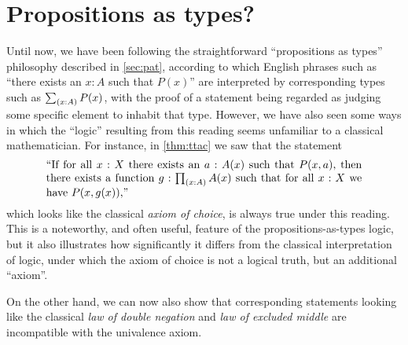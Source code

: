 \section{Propositions as types?}
\label{subsec:pat?}

Until now, we have been following the straightforward ``propositions as types'' philosophy described in \autoref{sec:pat}, according to which English phrases such as ``there exists an $x:A$ such that $P(x)$'' are interpreted by corresponding types such as $\sm{x:A} P(x)$, with the proof of a statement being regarded as judging some specific element to inhabit that type.
However, we have also seen some ways in which the ``logic'' resulting from this reading seems unfamiliar to a classical mathematician.
For instance, in \autoref{thm:ttac} we saw that the statement
\begin{equation}\label{eq:english-ac}
  \parbox{\textwidth-2cm}{``If for all $x:X$ there exists an $a:A(x)$ such that $P(x,a)$, then there exists a function $g:\prd{x:A} A(x)$ such that for all $x:X$ we have $P(x,g(x))$,''}
\end{equation}
which looks like the classical \emph{axiom of choice}, is always true under this reading. This is a noteworthy, and often useful, feature of the propositions-as-types logic, but it also illustrates how significantly it differs from the classical interpretation of logic, under which the axiom of choice is not a logical truth, but an additional ``axiom''.

On the other hand, we can now also show that corresponding statements looking like the classical \emph{law of double negation} and \emph{law of excluded middle} are incompatible with the univalence axiom.

